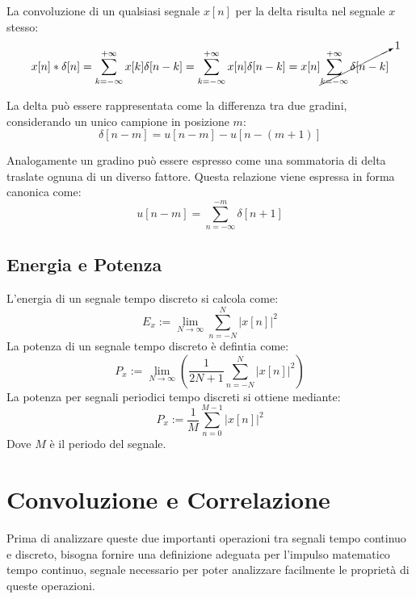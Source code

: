 \documentclass{article}
\numberwithin{equation}{subsection}
\begin{document}
La convoluzione di un qualsiasi segnale $x[n]$ per la delta risulta nel segnale $x$ stesso:
\begin{equation*}
    x[n]*\delta[n]=\displaystyle\sum_{k=-\infty}^{+\infty}x[k]\delta[n-k]=\sum_{k=-\infty}^{+\infty}x[n]\delta[n-k]=x[n]\cancelto{1}{\sum_{k=-\infty}^{+\infty}\delta[n-k]}
\end{equation*}


La delta può essere rappresentata come la differenza tra due gradini, considerando un unico campione in posizione $m$:
\begin{equation*}
    \delta[n-m]=u[n-m]-u[n-(m+1)]
\end{equation*}



Analogamente un gradino può essere espresso come una sommatoria di delta traslate ognuna di un diverso fattore. Questa relazione viene espressa in forma canonica come:
\begin{equation*}
    u[n-m]=\displaystyle\sum_{n=-\infty}^{-m}\delta[n+1]
\end{equation*}

\subsection{Energia e Potenza}

L'energia di un segnale tempo discreto si calcola come:
\begin{equation*}
    E_x:=\displaystyle\lim_{N\to\infty}\sum_{n=-N}^N|x[n]|^2
\end{equation*}
La potenza di un segnale tempo discreto è defintia come:
\begin{equation*}
    P_x:=\displaystyle\lim_{N\to\infty}\left(\frac{1}{2N+1}\sum_{n=-N}^N|x[n]|^2\right)
\end{equation*}
La potenza per segnali periodici tempo discreti si ottiene mediante:
\begin{equation*}
    P_x:=\displaystyle\frac{1}{M}\sum_{n=0}^{M-1}|x[n]|^2
\end{equation*}
Dove $M$ è il periodo del segnale.

\clearpage

\section{Convoluzione e Correlazione}

Prima di analizzare queste due importanti operazioni tra segnali tempo continuo e discreto, bisogna fornire una definizione adeguata per l'impulso matematico tempo 
continuo, segnale necessario per poter analizzare facilmente le proprietà di queste operazioni. 
\end{document}
